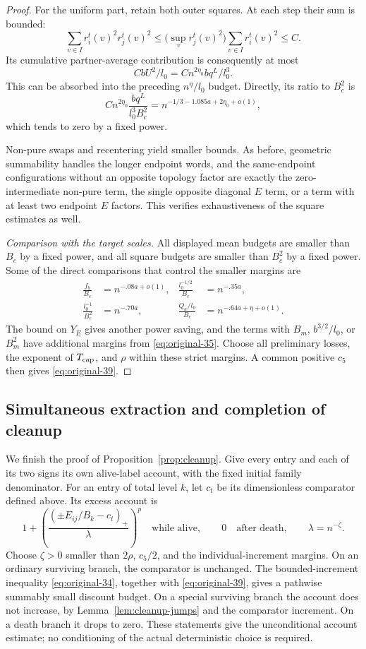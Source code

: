 \begin{proof}
For the uniform part, retain both outer squares.  At each
step their sum is bounded:
\[
 \sum_{v\in I}r_i^t(v)^2r_j^t(v)^2
 \leq \bigl(\sup_v r_j^t(v)^2\bigr)
                        \sum_{v\in I}r_i^t(v)^2\leq C.
\]
Its cumulative partner-average contribution is consequently at most
\[
 CbU^2/l_0=Cn^{2\eta_0}bq^L/l_0^3.
\]
This can be absorbed into the preceding $n^\eta/l_0$ budget.
Directly, its ratio to $B_c^2$ is
\[
 Cn^{2\eta_0}\frac{bq^L}{l_0^3B_c^2}
   =n^{-1/3-1.085a+2\eta_0+o(1)},
\]
which tends to zero by a fixed power.

Non-pure swaps and recentering yield smaller bounds.  As
before, geometric summability handles the longer endpoint
words, and the same-endpoint configurations without an
opposite topology factor are exactly the zero-intermediate
non-pure term, the single opposite diagonal $E$ term, or a
term with at least two endpoint $E$ factors.  This verifies
exhaustiveness of the square estimates as well.

\emph{Comparison with the target scales.}
All displayed mean budgets are smaller than $B_c$
by a fixed power, and all square budgets are smaller than
$B_c^2$ by a fixed power.  Some of the direct comparisons
that control the smaller margins are
\[
\begin{aligned}
 \frac{f_b}{B_c}&=n^{-.08a+o(1)},&
 \frac{l_0^{-1/2}}{B_c}&=n^{-.35a},\\
 \frac{l_0^{-1}}{B_c^2}&=n^{-.70a},&
 \frac{Q_a/l_0}{B_c}&=n^{-.64a+\eta+o(1)}.
\end{aligned}
\]
The bound on $Y_E$ gives another power saving, and the terms
with $B_m$, $b^{3/2}/l_0$, or $B_m^2$ have additional
margins from \eqref{eq:original-35}.  Choose all preliminary
losses, the exponent of $T_{\rm cap}$, and $\rho$ within
these strict margins.  A common positive $c_5$ then gives
\eqref{eq:original-39}.
\end{proof}

\subsection{Simultaneous extraction and completion of cleanup}

We finish the proof of Proposition~\ref{prop:cleanup}.  Give every
entry and each of its two signs its own alive-label account,
with the fixed initial family denominator.  For an entry of
total level $k$, let $c_t$ be its dimensionless comparator
defined above.  Its excess account is
\[
 1+\left(\frac{(\pm E_{ij}/B_k-c_t)_+}{\lambda}\right)^p
 \quad\text{while alive},\qquad 0\quad\text{after death},
 \qquad\lambda=n^{-\zeta}.
\]
Choose $\zeta>0$ smaller than $2\rho$, $c_5/2$, and the
individual-increment margins.  On an ordinary surviving
branch, the comparator is unchanged.  The bounded-increment
inequality \eqref{eq:original-34}, together with
\eqref{eq:original-39}, gives a pathwise summably small
discount budget.  On a special surviving branch the account
does not increase, by Lemma~\ref{lem:cleanup-jumps} and the
comparator increment.  On a death branch it drops to zero.
These statements give the unconditional account estimate;
no conditioning of the actual deterministic choice is
required.

